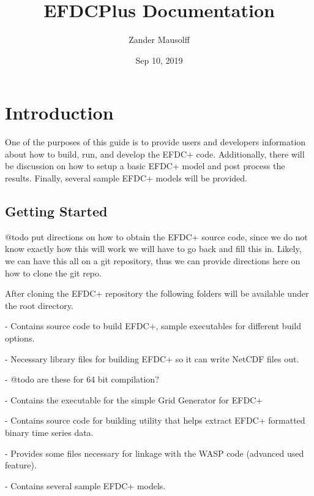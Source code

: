 \documentclass[letterpaper,10pt,english]{sphinxmanual}
\title{EFDCPlus Documentation}
\date{Sep 10, 2019}
\author{Zander Mausolff}
\begin{document}
\pagestyle{empty}
\sphinxmaketitle
\pagestyle{plain}
\sphinxtableofcontents
\pagestyle{normal}
\label{\detokenize{index::doc}}



\chapter{Introduction}
\label{\detokenize{index:introduction}}
One of the purposes of this guide is to provide users and developers information about how to build, run, and develop the EFDC+ code.  Additionally, there will be discussion on how to setup a basic EFDC+ model and post process the results. Finally, several sample EFDC+ models will be provided.


\section{Getting Started}
\label{\detokenize{started/index:getting-started}}\label{\detokenize{started/index:started}}\label{\detokenize{started/index::doc}}
@todo put directions on how to obtain the EFDC+ source code, since we do not know exactly how this will work we will have to go back and fill this in.
Likely, we can have this all on a git repository, thus we can provide directions here on how to clone the git repo.

After cloning the EFDC+ repository the following folders will be available under the root directory.

 - Contains source code to build EFDC+, sample executables for different build options.

 - Necessary library files for building EFDC+ so it can write NetCDF files out.

 - @todo are these for 64 bit compilation?

 - Contains the executable for the simple Grid Generator for EFDC+

 - Contains source code for building utility that helps extract EFDC+ formatted binary time series data.

 - Provides some files necessary for linkage with the WASP code (advanced used feature).

 - Contains several sample EFDC+ models.
\end{document}
